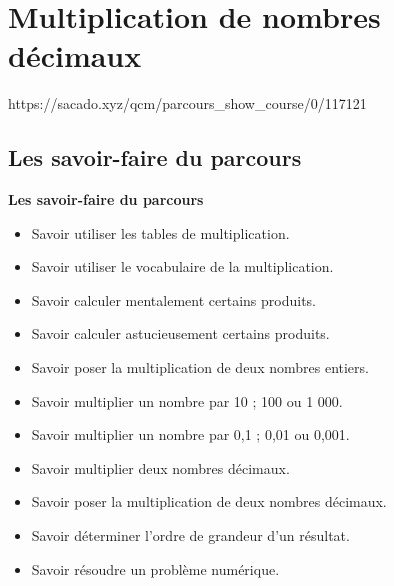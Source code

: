  
\chapter{Multiplication de nombres décimaux}
{https://sacado.xyz/qcm/parcours_show_course/0/117121}
{
 \section{Les savoir-faire du parcours}

\begin{CpsCol}
  \textbf{Les savoir-faire du parcours}
 \begin{itemize}
 \item Savoir utiliser les tables de multiplication.
 \item Savoir utiliser le vocabulaire de la multiplication.
 \item Savoir calculer mentalement certains produits.
 \item Savoir calculer astucieusement certains produits.
 \item Savoir poser la multiplication de deux nombres entiers.
 \item Savoir multiplier un nombre par 10 ; 100 ou 1 000.
 \item Savoir multiplier un nombre par 0,1 ; 0,01 ou 0,001.
 \item Savoir multiplier deux nombres décimaux.
 \item Savoir poser la multiplication de deux nombres décimaux.
 \item Savoir déterminer l'ordre de grandeur d'un résultat.
 \item Savoir résoudre un problème numérique.
 \end{itemize}
 \end{CpsCol}

 


}
